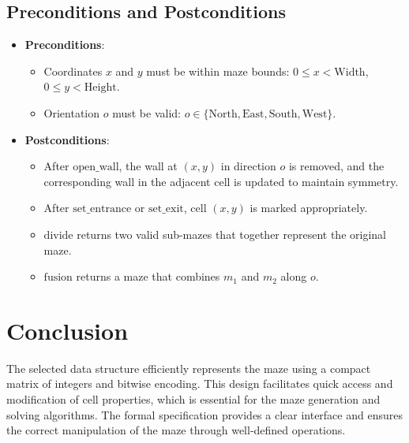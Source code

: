 \documentclass{article}
\begin{document}
\subsection*{Preconditions and Postconditions}

\begin{itemize}
    \item \textbf{Preconditions}:
    \begin{itemize}
        \item Coordinates \(x\) and \(y\) must be within maze bounds: \(0 \leq x < \text{Width}\), \(0 \leq y < \text{Height}\).
        \item Orientation \(o\) must be valid: \(o \in \{\text{North}, \text{East}, \text{South}, \text{West}\}\).
    \end{itemize}
    \item \textbf{Postconditions}:
    \begin{itemize}
        \item After \(\text{open\_wall}\), the wall at \((x, y)\) in direction \(o\) is removed, and the corresponding wall in the adjacent cell is updated to maintain symmetry.
        \item After \(\text{set\_entrance}\) or \(\text{set\_exit}\), cell \((x, y)\) is marked appropriately.
        \item \(\text{divide}\) returns two valid sub-mazes that together represent the original maze.
        \item \(\text{fusion}\) returns a maze that combines \(m_1\) and \(m_2\) along \(o\).
    \end{itemize}
\end{itemize}

\section*{Conclusion}

The selected data structure efficiently represents the maze using a compact matrix of integers and bitwise encoding. This design facilitates quick access and modification of cell properties, which is essential for the maze generation and solving algorithms. The formal specification provides a clear interface and ensures the correct manipulation of the maze through well-defined operations.
\end{document}
